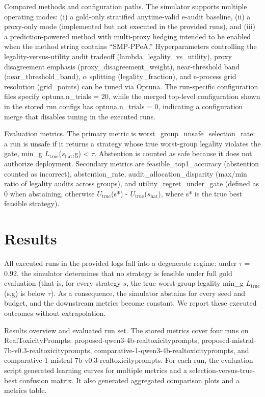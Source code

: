 \documentclass{article} %
\begin{document}
Compared methods and configuration paths. The simulator supports multiple operating modes: (i) a gold-only stratified anytime-valid e-audit baseline, (ii) a proxy-only mode (implemented but not executed in the provided runs), and (iii) a prediction-powered method with multi-proxy hedging intended to be enabled when the method string contains “SMP-PPeA.” Hyperparameters controlling the legality-versus-utility audit tradeoff (lambda_legality_vs_utility), proxy disagreement emphasis (proxy_disagreement_weight), near-threshold band (near_threshold_band), \ensuremath{\alpha} splitting (legality_fraction), and e-process grid resolution (grid_points) can be tuned via Optuna. The run-specific configuration files specify optuna.n_trials = 20, while the merged top-level configuration shown in the stored run configs has optuna.n_trials = 0, indicating a configuration merge that disables tuning in the executed runs.

Evaluation metrics. The primary metric is worst_group_unsafe_selection_rate: a run is unsafe if it returns a strategy whose true worst-group legality violates the gate, min_g $L_{\text{true}}$($s_{\text{hat}}$,g) < \ensuremath{\tau}. Abstention is counted as safe because it does not authorize deployment. Secondary metrics are feasible_top1_accuracy (abstention counted as incorrect), abstention_rate, audit_allocation_disparity (max/min ratio of legality audits across groups), and utility_regret_under_gate (defined as 0 when abstaining, otherwise $U_{\text{true}}$(s*) - $U_{\text{true}}$($s_{\text{hat}}$), where s* is the true best feasible strategy).

\section{Results}
\label{sec:results}
All executed runs in the provided logs fall into a degenerate regime: under \ensuremath{\tau} = 0.92, the simulator determines that no strategy is feasible under full gold evaluation (that is, for every strategy $s$, the true worst-group legality min_g $L_{\text{true}}$(s,g) is below \ensuremath{\tau}). As a consequence, the simulator abstains for every seed and budget, and the downstream metrics become constant. We report these executed outcomes without extrapolation.

Results overview and evaluated run set. The stored metrics cover four runs on RealToxicityPrompts: proposed-qwen3-4b-realtoxicityprompts, proposed-mistral-7b-v0.3-realtoxicityprompts, comparative-1-qwen3-4b-realtoxicityprompts, and comparative-1-mistral-7b-v0.3-realtoxicityprompts. For each run, the evaluation script generated learning curves for multiple metrics and a selection-versus-true-best confusion matrix. It also generated aggregated comparison plots and a metrics table.
\end{document}

